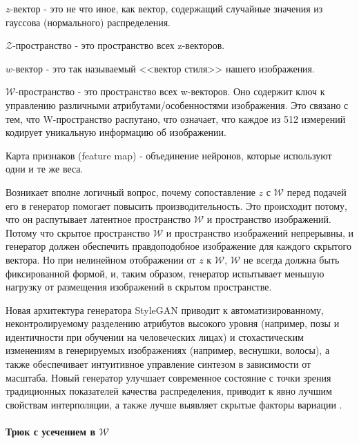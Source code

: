 \begin{definition}
    $z$-вектор - это не что иное, как вектор, содержащий случайные значения из гауссова (нормального) распределения.
\end{definition}
\begin{definition}
    $\mathcal{Z}$-пространство - это пространство всех z-векторов.
\end{definition}
\begin{definition}
    $w$-вектор - это так называемый <<вектор стиля>> нашего изображения.
\end{definition}
\begin{definition}
    $\mathcal{W}$-пространство - это пространство всех w-векторов. Оно содержит ключ к управлению различными атрибутами/особенностями изображения. Это связано с тем, что W-пространство распутано, что означает, что каждое из 512 измерений кодирует уникальную информацию об изображении.
\end{definition}
\begin{definition}
    Карта признаков (feature map) - объединение нейронов, которые используют одни и те же веса.
\end{definition}

Возникает вполне логичный вопрос, почему сопоставление $z$ с $\mathcal{W}$ перед подачей его в генератор помогает повысить производительность. Это происходит потому, что он распутывает латентное пространство $\mathcal{W}$ и пространство изображений. Потому что скрытое пространство $\mathcal{W}$ и пространство изображений непрерывны, и генератор должен обеспечить правдоподобное изображение для каждого скрытого вектора. Но при нелинейном отображении от $z$ к $\mathcal{W}$, $\mathcal{W}$ не всегда должна быть фиксированной формой, и, таким образом, генератор испытывает меньшую нагрузку от размещения изображений в скрытом пространстве.

Новая архитектура генератора StyleGAN приводит к автоматизированному, неконтролируемому разделению атрибутов высокого уровня (например, позы и идентичности при обучении на человеческих лицах) и стохастическим изменениям в генерируемых изображениях (например, веснушки, волосы), а также обеспечивает интуитивное управление синтезом в зависимости от масштаба. Новый генератор улучшает современное состояние с точки зрения традиционных показателей качества распределения, приводит к явно лучшим свойствам интерполяции, а также лучше выявляет скрытые факторы вариации \cite{StyleGAN}.

\paragraph{Трюк с усечением в $\mathcal{W}$}

